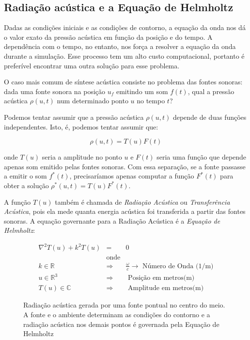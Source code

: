 \subsection{Radiação acústica e a Equação de Helmholtz}

Dadas as condições iniciais e as condições de contorno, a equação da onda nos dá o valor exato da pressão acústica em função da posição e do tempo. A dependência com o tempo, no entanto, nos força a resolver a equação da onda durante a simulação. Esse processo tem um alto custo computacional, portanto é preferível encontrar uma outra solução para esse problema.


O caso mais comum de síntese acústica consiste no problema das fontes sonoras: dada uma fonte sonora na posição $u_f$ emitindo um som $f(t)$, qual a pressão acústica $\rho(u, t)$ num determinado ponto $u$ no tempo $t$?

Podemos tentar assumir que a pressão acústica $\rho(u, t)$ depende de duas funções independentes. Isto, é, podemos tentar assumir que:

\begin{equation}
	\rho(u, t) = T(u)F(t)
\end{equation}

onde $T(u)$ seria a amplitude no ponto $u$ e $F(t)$ seria uma função que depende apenas som emitido pelas fontes sonoras. Com essa separação, se a fonte passasse a emitir o som $f^*(t)$, precisaríamos apenas computar a função $F^*(t)$ para obter a solução $\rho^*(u, t) = T(u)F^*(t)$. 

A função $T(u)$ também é chamada de \emph{Radiação Acústica} ou \emph{Transferência Acústica}, pois ela mede quanta energia acústica foi transferida a partir das fontes sonoras. A equação governante para a Radiação Acústica é a \emph{Equação de Helmholtz}:

\begin{eqnarray}
	\nabla^2 T(u) + k^2T(u) &=& 0\label{helmholtzequation}\\
&\text{onde}&\nonumber\\
k \in \mathbb{R} &\Rightarrow& \frac{\omega}{c}\rightarrow\text{ Número de Onda (1/m)} \nonumber\\
u \in \mathbb{R}^3 &\Rightarrow& \text{ Posição em metros(m)} \nonumber\\
T(u) \in \mathbb{C} &\Rightarrow& \text{ Amplitude em metros(m)} \nonumber
\end{eqnarray}

\begin{figure}[ht]
	\centering
	
	\caption[Radiação acústica gerada uma fonte pontual]{Radiação acústica gerada por uma fonte pontual no centro do meio. A fonte e o ambiente determinam as condições do contorno e a radiação acústica nos demais pontos é governada pela Equação de Helmholtz}\label{helmholtz}
\end{figure}

